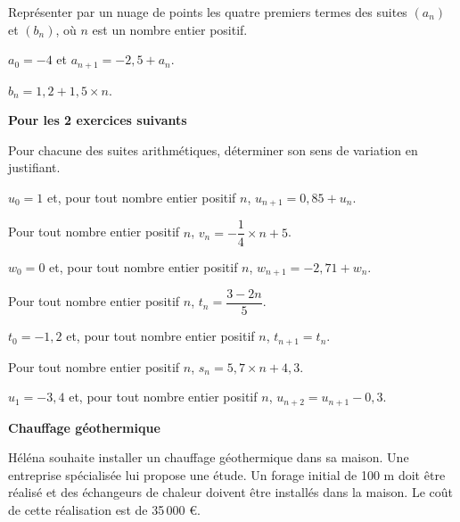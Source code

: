 \documentclass[12pt,a4paper]{book}
\begin{document}
\exerciceDS{}

Représenter par un nuage de points les quatre premiers termes des suites $(a_n)$ et $(b_n)$, où $n$ est un nombre entier positif.
\begin{enumMet}
	\item $a_0=-4$ et $a_{n+1}=-2,5+a_n$.
	\item $b_n=1,2+1,5\times n$.
\end{enumMet}

\vspace{0.3cm}
\noindent\textbf{Pour les 2 exercices suivants}

\noindent Pour chacune des suites arithmétiques, déterminer son sens de variation en justifiant.

\exerciceDS{}

\begin{enumMet}
	\item $u_0=1$ et, pour tout nombre entier positif $n$, $u_{n+1}=0,85+u_n$.
	\item Pour tout nombre entier positif $n$, $v_n=-\dfrac{1}{4}\times n+5$.
	\item $w_0=0$ et, pour tout nombre entier positif $n$, $w_{n+1}=-2,71+w_n$.
	\item Pour tout nombre entier positif $n$, $t_n=\dfrac{3-2n}{5}$.
\end{enumMet}

\exerciceDS{}

\begin{enumMet}
	\item $t_0=-1,2$ et, pour tout nombre entier positif $n$, $t_{n+1}=t_n$.
	\item Pour tout nombre entier positif $n$, $s_n=5,7\times n+4,3$.
	\item $u_1=-3,4$ et, pour tout nombre entier positif $n$, $u_{n+2}=u_{n+1}-0,3$.
\end{enumMet}

\exerciceDS{} \textbf{Chauffage géothermique}

Héléna souhaite installer un chauffage géothermique dans sa maison. Une entreprise spécialisée lui propose une étude. Un forage initial de 100 m doit être réalisé et des échangeurs de chaleur doivent être installés dans la maison. Le coût de cette réalisation est de 35\,000 \euro.
\end{document}

